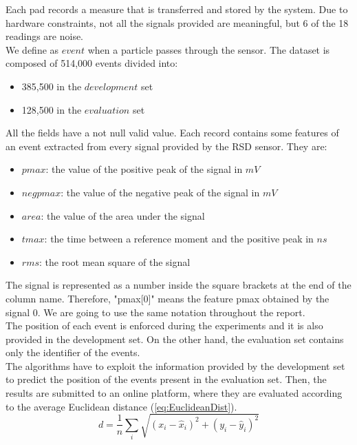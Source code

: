 \documentclass[conference]{IEEEtran}
\begin{document}
Each pad records a measure that is transferred and stored by the system. Due to hardware constraints, not all the signals provided are meaningful, but 6 of the 18 readings are noise. \\

We define as $event$ when a particle passes through the sensor. The dataset is composed of 514,000 events divided into:
\begin{itemize}
    \item 385,500 in the $development$ set
    \item 128,500 in the $evaluation$ set
\end{itemize}

All the fields have a not null valid value. Each record contains some features of an event extracted from every signal provided by the RSD sensor. They are:
\begin{itemize}
    \label{lst:typeFeature}
    \item $pmax$: the value of the positive peak of the signal in $mV$
    \item $negpmax$: the value of the negative peak of the signal in $mV$
    \item $area$: the value of the area under the signal
    \item $tmax$: the time between a reference moment and the positive peak in $ns$
    \item $rms$: the root mean square of the signal
\end{itemize}
The signal is represented as a number inside the square brackets at the end of the column name. Therefore, "pmax[0]" means the feature pmax obtained by the signal 0. We are going to use the same notation throughout the report.\\
The position of each event is enforced during the experiments and it is also provided in the development set. On the other hand, the evaluation set contains only the identifier of the events. \\

The algorithms have to exploit the information provided by the development set to predict the position of the events present in the evaluation set. Then, the results are submitted to an online platform, where they are evaluated according to the average Euclidean distance (\ref{eq:EuclideanDist}).
\begin{equation}
    \label{eq:EuclideanDist}
    d=\frac{1}{n} \sum_i \sqrt{(x_i-\hat{x}_i)^2+(y_i-\hat{y}_i)^2}
\end{equation} 
\end{document}
